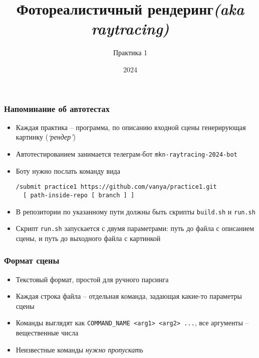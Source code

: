 \documentclass[10pt,handout]{beamer}
\title{Фотореалистичный рендеринг\quad\quad\quad\quad\quad\quad \textit{(aka raytracing)}}
\subtitle{Практика 1}
\date{2024}
\begin{document}
\frame{\titlepage}

\begin{frame}[fragile]
\frametitle{Напоминание об автотестах}
\begin{itemize}
\item Каждая практика -- программа, по описанию входной сцены генерирующая картинку (\textit{`рендер'})
\pause
\item Автотестированием занимается телеграм-бот \texttt{mkn-raytracing-2024-bot}
\pause
\item Боту нужно послать команду вида
\begin{verbatim}
/submit practice1 https://github.com/vanya/practice1.git
  [ path-inside-repo [ branch ] ]
\end{verbatim}
\pause
\item В репозитории по указанному пути должны быть скрипты \texttt{build.sh} и \texttt{run.sh}
\pause
\item Скрипт \texttt{run.sh} запускается с двумя параметрами: путь до файла с описанием сцены, и путь до выходного файла с картинкой
\end{itemize}
\end{frame}

\begin{frame}
\frametitle{Формат сцены}
\begin{itemize}
\item Текстовый формат, простой для ручного парсинга
\pause
\item Каждая строка файла -- отдельная команда, задающая какие-то параметры сцены
\pause
\item Команды выглядят как \texttt{COMMAND\_NAME <arg1> <arg2> ...}, все аргументы -- вещественные числа
\pause
\item Неизвестные команды \textit{нужно пропускать}
\end{itemize}
\end{frame}
\end{document}
